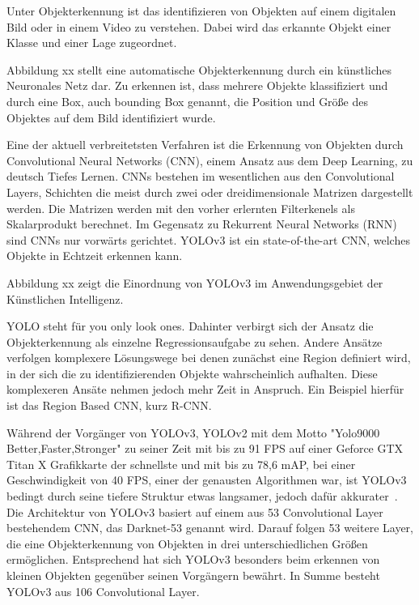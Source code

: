 Unter Objekterkennung ist das identifizieren von Objekten auf einem digitalen Bild oder in einem Video zu verstehen. Dabei wird das erkannte Objekt einer Klasse und einer Lage zugeordnet. 

Abbildung xx stellt eine automatische Objekterkennung durch ein künstliches Neuronales Netz dar. Zu erkennen ist, dass mehrere Objekte klassifiziert und durch eine Box, auch bounding Box genannt, die Position und Größe des Objektes auf dem Bild identifiziert wurde. 

Eine der aktuell verbreitetsten Verfahren ist die Erkennung von Objekten durch Convolutional Neural Networks (CNN), einem Ansatz aus dem Deep Learning, zu deutsch Tiefes Lernen. CNNs bestehen im wesentlichen aus den Convolutional Layers, Schichten die meist durch zwei oder dreidimensionale Matrizen dargestellt werden. Die Matrizen werden mit den vorher erlernten Filterkenels als Skalarprodukt berechnet. Im Gegensatz zu Rekurrent Neural Networks (RNN) sind CNNs nur vorwärts gerichtet. YOLOv3 ist ein state-of-the-art CNN, welches Objekte in Echtzeit erkennen kann.  




Abbildung xx zeigt die Einordnung von YOLOv3 im Anwendungsgebiet der Künstlichen Intelligenz. 


YOLO steht für you only look ones. Dahinter verbirgt sich der Ansatz die Objekterkennung als einzelne Regressionsaufgabe zu sehen. Andere Ansätze verfolgen komplexere Lösungswege bei denen zunächst eine Region definiert wird, in der sich die zu identifizierenden Objekte wahrscheinlich aufhalten. Diese komplexeren Ansäte nehmen jedoch mehr Zeit in Anspruch. Ein Beispiel hierfür ist das Region Based CNN, kurz R-CNN. 

Während der Vorgänger von YOLOv3, YOLOv2 mit dem Motto "Yolo9000 Better,Faster,Stronger" zu seiner Zeit mit bis zu 91 FPS auf einer Geforce GTX Titan X Grafikkarte der schnellste und mit bis zu 78,6 mAP, bei einer Geschwindigkeit von 40 FPS, einer der genausten Algorithmen war, ist YOLOv3 bedingt durch seine tiefere Struktur etwas langsamer, jedoch dafür akkurater~\cite{redmon2017yolo9000}. Die Architektur von YOLOv3 basiert auf einem aus 53 Convolutional Layer bestehendem CNN, das Darknet-53 genannt wird. 
Darauf folgen 53 weitere Layer, die eine Objekterkennung von Objekten in drei unterschiedlichen Größen ermöglichen. Entsprechend hat sich YOLOv3 besonders beim erkennen von kleinen Objekten gegenüber seinen Vorgängern bewährt. In Summe besteht YOLOv3 aus 106 Convolutional Layer.

